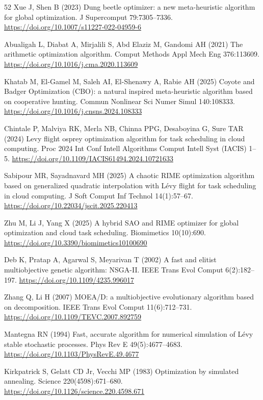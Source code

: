 \documentclass[pdflatex,onecolumn,sn-mathphys-num]{sn-jnl}
\begin{document}
\begin{thebibliography}{52}
Xue J, Shen B (2023) Dung beetle optimizer: a new meta-heuristic algorithm for global optimization. J Supercomput 79:7305--7336. \url{https://doi.org/10.1007/s11227-022-04959-6}

Abualigah L, Diabat A, Mirjalili S, Abd Elaziz M, Gandomi AH (2021) The arithmetic optimization algorithm. Comput Methods Appl Mech Eng 376:113609. \url{https://doi.org/10.1016/j.cma.2020.113609}

Khatab M, El-Gamel M, Saleh AI, El-Shenawy A, Rabie AH (2025) Coyote and Badger Optimization (CBO): a natural inspired meta-heuristic algorithm based on cooperative hunting. Commun Nonlinear Sci Numer Simul 140:108333. \url{https://doi.org/10.1016/j.cnsns.2024.108333}

Chintale P, Malviya RK, Merla NB, Chinna PPG, Desaboyina G, Sure TAR (2024) Levy flight osprey optimization algorithm for task scheduling in cloud computing. Proc 2024 Int Conf Intell Algorithms Comput Intell Syst (IACIS) 1--5. \url{https://doi.org/10.1109/IACIS61494.2024.10721633}

Sabipour MR, Sayadnavard MH (2025) A chaotic RIME optimization algorithm based on generalized quadratic interpolation with L\'{e}vy flight for task scheduling in cloud computing. J Soft Comput Inf Technol 14(1):57--67. \url{https://doi.org/10.22034/jscit.2025.220413}

Zhu M, Li J, Yang X (2025) A hybrid SAO and RIME optimizer for global optimization and cloud task scheduling. Biomimetics 10(10):690. \url{https://doi.org/10.3390/biomimetics10100690}

Deb K, Pratap A, Agarwal S, Meyarivan T (2002) A fast and elitist multiobjective genetic algorithm: NSGA-II. IEEE Trans Evol Comput 6(2):182--197. \url{https://doi.org/10.1109/4235.996017}

Zhang Q, Li H (2007) MOEA/D: a multiobjective evolutionary algorithm based on decomposition. IEEE Trans Evol Comput 11(6):712--731. \url{https://doi.org/10.1109/TEVC.2007.892759}

Mantegna RN (1994) Fast, accurate algorithm for numerical simulation of L\'{e}vy stable stochastic processes. Phys Rev E 49(5):4677--4683. \url{https://doi.org/10.1103/PhysRevE.49.4677}

Kirkpatrick S, Gelatt CD Jr, Vecchi MP (1983) Optimization by simulated annealing. Science 220(4598):671--680. \url{https://doi.org/10.1126/science.220.4598.671}


\end{thebibliography}
\end{document}
